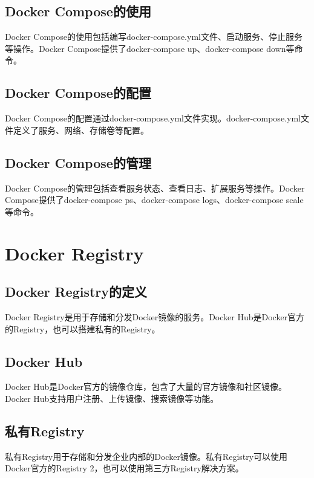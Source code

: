 \documentclass[12pt,UTF8]{ctexbook}
\begin{document}
\section{Docker Compose的使用}

Docker Compose的使用包括编写docker-compose.yml文件、启动服务、停止服务等操作。Docker Compose提供了docker-compose up、docker-compose down等命令。

\section{Docker Compose的配置}

Docker Compose的配置通过docker-compose.yml文件实现。docker-compose.yml文件定义了服务、网络、存储卷等配置。

\section{Docker Compose的管理}

Docker Compose的管理包括查看服务状态、查看日志、扩展服务等操作。Docker Compose提供了docker-compose ps、docker-compose logs、docker-compose scale等命令。

\chapter{Docker Registry}

\section{Docker Registry的定义}

Docker Registry是用于存储和分发Docker镜像的服务。Docker Hub是Docker官方的Registry，也可以搭建私有的Registry。

\section{Docker Hub}

Docker Hub是Docker官方的镜像仓库，包含了大量的官方镜像和社区镜像。Docker Hub支持用户注册、上传镜像、搜索镜像等功能。

\section{私有Registry}

私有Registry用于存储和分发企业内部的Docker镜像。私有Registry可以使用Docker官方的Registry 2，也可以使用第三方Registry解决方案。
\end{document}
